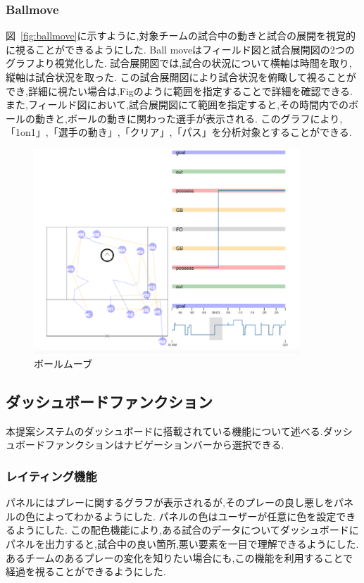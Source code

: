 \documentclass[sotsuron]{kuee}
\begin{document}
			\subsubsection{Ballmove}
				図~\ref{fig:ballmove}に示すように,対象チームの試合中の動きと試合の展開を視覚的に視ることができるようにした.
				Ball moveはフィールド図と試合展開図の2つのグラフより視覚化した.
				試合展開図では,試合の状況について横軸は時間を取り,縦軸は試合状況を取った.
				この試合展開図により試合状況を俯瞰して視ることができ,詳細に視たい場合は,Figのように範囲を指定することで詳細を確認できる.
				また,フィールド図において,試合展開図にて範囲を指定すると,その時間内でのボールの動きと,ボールの動きに関わった選手が表示される.
				このグラフにより,「1on1」,「選手の動き」,「クリア」,「パス」を分析対象とすることができる.
					\begin{figure}
						\begin{center}
							\includegraphics[width=10cm]{ballmove.eps}
						\end{center}
						\caption{ボールムーブ}
				  		\label{fig:basllmove}
					\end{figure}
		\subsection{ダッシュボードファンクション}
			本提案システムのダッシュボードに搭載されている機能について述べる.ダッシュボードファンクションはナビゲーションバーから選択できる.
			\subsubsection{レイティング機能}
			パネルにはプレーに関するグラフが表示されるが,そのプレーの良し悪しをパネルの色によってわかるようにした.
			パネルの色はユーザーが任意に色を設定できるようにした.
			この配色機能により,ある試合のデータについてダッシュボードにパネルを出力すると,試合中の良い箇所,悪い要素を一目で理解できるようにした.
			あるチームのあるプレーの変化を知りたい場合にも,この機能を利用することで経過を視ることができるようにした.
\end{document}

